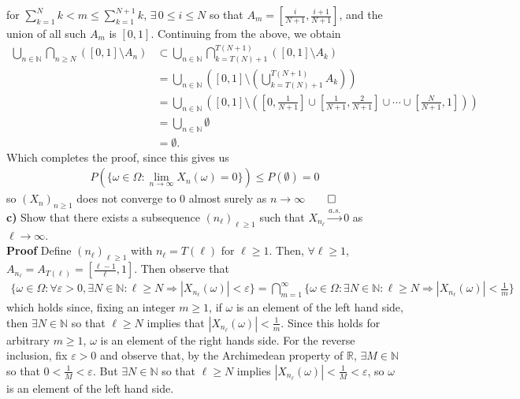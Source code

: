 \documentclass[10pt]{article}
\newcommand{\bp}[1]{\left({#1}\right)}
\newcommand{\mbb}[1]{\mathbb{#1}}
\newcommand{\1}[1]{\mathbbm{1}_{#1}}
\begin{document}
    for $\sum_{k=1}^Nk<m\leq\sum_{k=1}^{N+1}k$, $\exists\, 0\leq i\leq N$ so that $A_m=[\tfrac{i}{N+1},\tfrac{i+1}{N+1}]$, and the union of all such $A_m$ is $[0,1]$. Continuing from the above, we obtain
    \begin{align*}
        \bigcup_{n\in\mbb{N}}\bigcap_{n\geq N}([0,1]\setminus A_n)&\subset\bigcup_{n\in\mbb{N}}\bigcap_{k=T(N)+1}^{T(N+1)}([0,1]\setminus A_k)\tag{$N<T(N)+1\leq T(N+1)$}\\
        &=\bigcup_{n\in\mbb{N}}\bp{[0,1]\setminus\bp{\bigcup_{k=T(N)+1}^{T(N+1)}A_k}}\tag{DeMorgan's Law}\\
        &=\bigcup_{n\in\mbb{N}}\bp{[0,1]\setminus\bp{[0,\tfrac{1}{N+1}]\cup[\tfrac{1}{N+1},\tfrac{2}{N+1}]\cup\cdots\cup[\tfrac{N}{N+1},1]}}\\
        &=\bigcup_{n\in\mbb{N}}\emptyset\\
        &=\emptyset.
    \end{align*}
    Which completes the proof, since this gives us
    \begin{align*}
        P(\{\omega\in\Omega:\lim_{n\rightarrow\infty}X_n(\omega)=0\})\leq P(\emptyset)=0
    \end{align*}
    so $(X_n)_{n\geq 1}$ does not converge to $0$ almost surely as $n\rightarrow\infty$\hfill{$\qed$}\\[5pt]
    {\bf c)} Show that there exists a subsequence $(n_\ell)_{\ell\geq 1}$ such that $X_{n_\ell}\overset{a.s.}{\longrightarrow}0$ as $\ell\rightarrow\infty$.\\[5pt]
    {\bf Proof}\hspace{5pt} Define $(n_\ell)_{\ell\geq 1}$ with $n_\ell=T(\ell)$ for $\ell\geq 1$. Then, $\forall\ell\geq 1$, $A_{n_\ell}=A_{T(\ell)}=[\tfrac{\ell-1}{\ell},1]$. Then observe that
    \begin{align*}
        \{\omega\in\Omega:\forall\varepsilon>0,\exists N\in\mbb{N}:\ell\geq N\Rightarrow|X_{n_\ell}(\omega)|<\varepsilon\}=\bigcap_{m=1}^\infty\{\omega\in\Omega:\exists N\in\mbb{N}:\ell\geq N\Rightarrow|X_{n_\ell}(\omega)|<\tfrac{1}{m}\}\tag{14}
    \end{align*}
    which holds since, fixing an integer $m\geq 1$, if $\omega$ is an element of the left hand side, then $\exists N\in\mbb{N}$ so that $\ell\geq N$ implies that $|X_{n_\ell}(\omega)|<\tfrac{1}{m}$. Since this holds for arbitrary $m\geq 1$, $\omega$ is an element of the right hands side. For the reverse inclusion, fix $\varepsilon>0$
    and observe that, by the Archimedean property of $\mbb{R}$, $\exists M\in\mbb{N}$ so that $0<\frac{1}{M}<\varepsilon$. But $\exists N\in\mbb{N}$ so that $\ell\geq N$ implies $|X_{n_\ell}(\omega)|<\tfrac{1}{M}<\varepsilon$, so $\omega$ is an element of the left hand side.\\[5pt]
\end{document}
